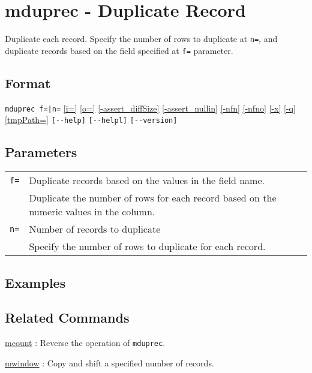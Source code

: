
%

\section{mduprec - Duplicate Record\label{sect:mduprec}}
Duplicate each record. Specify the number of rows to duplicate at \verb|n=|, and duplicate records based on the field specified at \verb|f=| parameter.  

\subsection*{Format}
\verb/mduprec f=|n=/
\hyperref[sect:option_i]{[i=]}
\hyperref[sect:option_o]{[o=]}
\hyperref[sect:option_assert_diffSize]{[-assert\_diffSize]}
\hyperref[sect:option_assert_nullin]{[-assert\_nullin]}
\hyperref[sect:option_nfn]{[-nfn]} 
\hyperref[sect:option_nfno]{[-nfno]}  
\hyperref[sect:option_x]{[-x]}
\hyperref[sect:option_q]{[-q]}
\hyperref[sect:option_option_tmppath]{[tmpPath=]}
\verb|[--help]|
\verb|[--helpl]|
\verb|[--version]|\\

\subsection*{Parameters}
\begin{table}[htbp]
{\small
\begin{tabular}{ll}
\verb|f=|    & Duplicate records based on the values in the field name.\\
             & Duplicate the number of rows for each record based on the numeric values in the column. \\
\verb|n=|    & Number of records to duplicate\\
             & Specify the number of rows to duplicate for each record. \\
\end{tabular} 
}
\end{table} 
\subsection*{Examples}


\subsection*{Related Commands}
\hyperref[sect:mcount]{mcount} : Reverse the operation of \verb|mduprec|.

\hyperref[sect:mwindow]{mwindow} : Copy and shift a specified number of records. 

%
